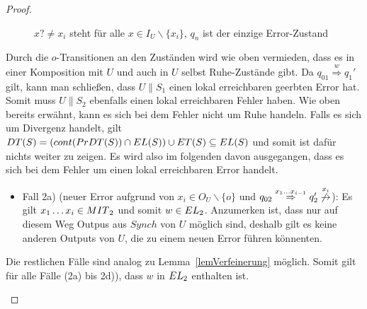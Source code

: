 \begin{proof}
\begin{itemize}
\begin{figure} [h!tbp]
\begin{center}
        \caption{$x?\neq x_i$ steht für alle $x\in I_U\backslash\{x_i\}$, $q_n$
          ist der einzige Error-Zustand}
\label{UmitEundO}
      \end{center}
      \end{figure}
      Durch die $o$-Transitionen an den Zuständen wird wie oben vermieden, dass
      es in einer Komposition mit $U$ und auch in $U$ selbst Ruhe-Zustände
      gibt. Da $q_{01} \overset{w}{\Rightarrow} q_1'$ gilt, kann man schließen,
      dass $U\|S_1$ einen lokal erreichbaren geerbten Error hat. Somit muss
      $U\|S_2$ ebenfalls einen lokal erreichbaren Fehler haben. Wie oben
      bereits erwähnt, kann es sich bei dem Fehler nicht um Ruhe handeln. Falls
      es sich um Divergenz handelt, gilt $DT{}(S) = (cont{}(PrDT{}(S))\cap
      EL{}(S))\cup ET{}(S)\subseteq EL{}(S)$ und somit ist dafür nichts
      weiter zu zeigen. Es wird also im folgenden davon ausgegangen, dass es
      sich bei dem Fehler um einen lokal erreichbaren Error handelt.
      \begin{itemize}
        \item Fall 2a) (neuer Error aufgrund von $x_i\in O_U\backslash\{o\}$
          und $q_{02} \overset{x_1\dots x_{i-1}}{\Rightarrow} q_2'
          \overset{x_i}{\not{\hspace{-0.1cm}\rightarrow}}$): Es gilt $x_1\dots
          x_i\in MIT{}_2$ und somit $w\in EL{}_2$. Anzumerken ist, dass nur
          auf diesem Weg Outpus aus $Synch$ von $U$ möglich sind, deshalb gilt
          es keine anderen Outputs von $U$, die zu einem neuen Error führen
          könnenten.
      \end{itemize}
      Die restlichen Fälle sind analog zu Lemma~\ref{lemVerfeinerung} möglich.
      Somit gilt für alle Fälle (2a) bis 2d)), dass $w$ in $EL{}_2$ enthalten
      ist.
  \end{itemize}


\end{proof}
